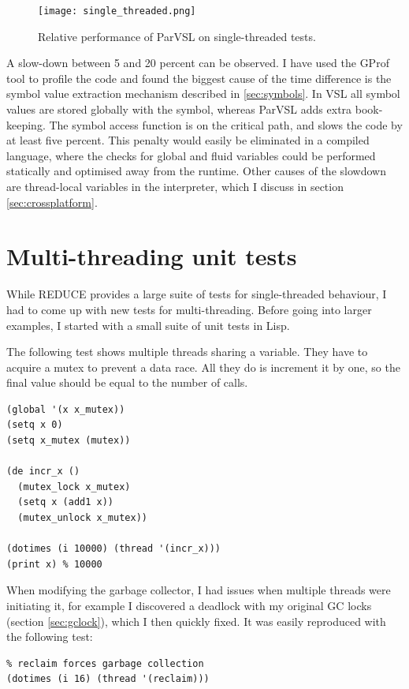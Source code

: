 \begin{figure}[h]
  \centering
  \texttt{[image: single\_threaded.png]}
  \caption{Relative performance of ParVSL on single-threaded tests.}
  \label{fig:single-threaded}
\end{figure}


A slow-down between 5 and 20 percent can be observed. I have used the GProf \cite{gprof}
tool to profile the code and found the biggest cause of the time difference is the
symbol value extraction mechanism described in \ref{sec:symbols}. In VSL all symbol
values are stored globally with the symbol, whereas ParVSL adds extra book-keeping.
The symbol access function is on the critical path, and slows the code by at least
five percent. This penalty would easily be eliminated in a compiled language, where the
checks for global and fluid variables could be performed statically and optimised away
from the runtime. Other causes of the slowdown are thread-local variables in the interpreter,
which I discuss in section \ref{sec:crossplatform}.

\section{Multi-threading unit tests}

While REDUCE provides a large suite of tests for single-threaded behaviour, I had to come
up with new tests for multi-threading. Before going into larger examples, I started with a small
suite of unit tests in Lisp.

The following test shows multiple threads sharing a variable. They have to acquire
a mutex to prevent a data race. All they do is increment it by one, so the final
value should be equal to the number of calls.

\label{lst:shared-global}
\begin{verbatim}
(global '(x x_mutex))
(setq x 0)
(setq x_mutex (mutex))

(de incr_x ()
  (mutex_lock x_mutex)
  (setq x (add1 x))
  (mutex_unlock x_mutex))

(dotimes (i 10000) (thread '(incr_x)))
(print x) % 10000
\end{verbatim}

When modifying the garbage collector, I had issues when multiple
threads were initiating it, for example I discovered a deadlock
with my original GC locks (section \ref{sec:gclock}), which I then
quickly fixed. It was easily reproduced with the following test:

\label{lst:multi-gc}
\begin{verbatim}
% reclaim forces garbage collection
(dotimes (i 16) (thread '(reclaim)))
\end{verbatim}

